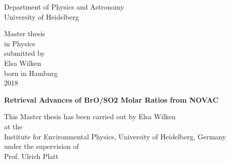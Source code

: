 
\thispagestyle{empty}
\begin{center}
  \renewcommand{\baselinestretch}{2.00}
  \Large\sffamily
  Department of Physics and Astronomy\\
  \large University of Heidelberg
  \par\vfill\normalfont
  Master thesis\\
  in Physics\\
  submitted by\\
  Elsa  Wilken\\
  born in Hamburg\\
  2018
\end{center}
\newpage

\thispagestyle{empty}
\begin{center}
  \renewcommand{\baselinestretch}{2.00}
  \Large\bfseries\sffamily
    Retrieval Advances of BrO/SO2 Molar Ratios from NOVAC\\
  \par
  \vfill
  \large\normalfont
  This Master thesis has been carried out by Elsa Wilken\\
  at the\\
  Institute for Environmental Physics, University of Heidelberg, Germany\\
  under the supervision of\\
  Prof. Ulrich Platt
\end{center}\par
\vspace{5\baselineskip}

\renewcommand{\baselinestretch}{1.00}\normalsize
